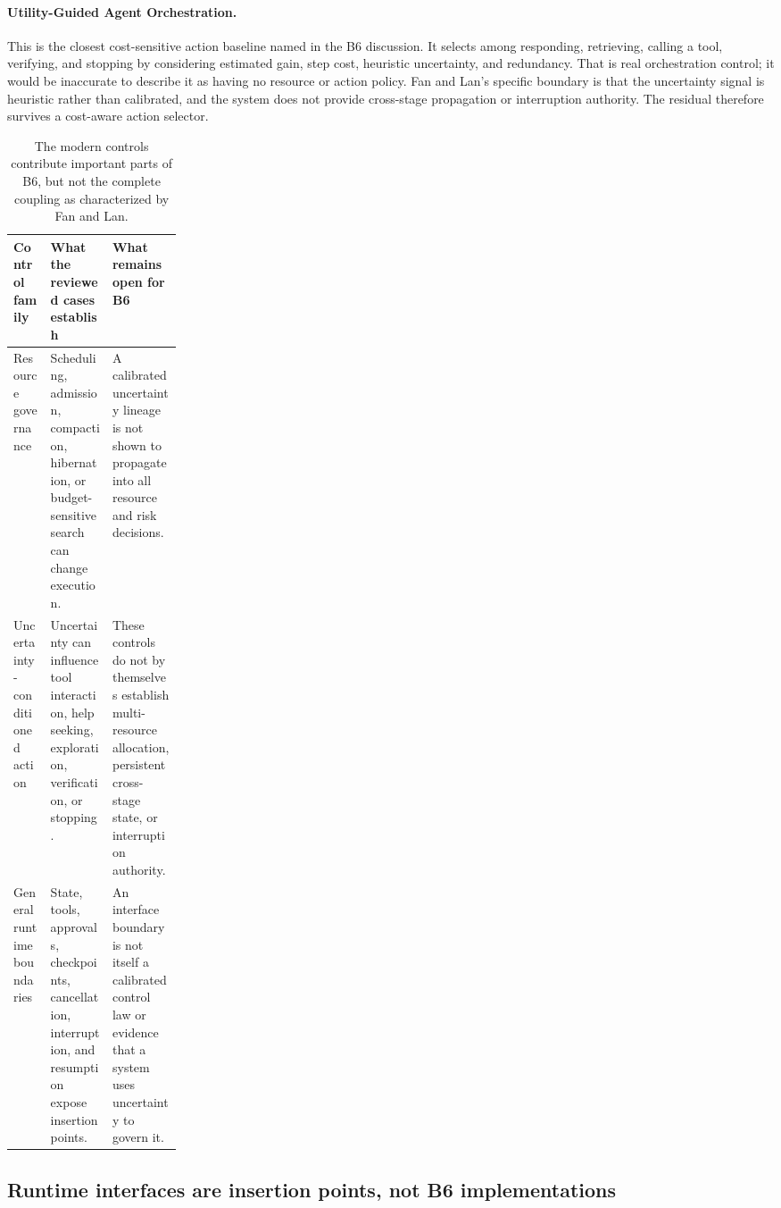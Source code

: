 \paragraph{Utility-Guided Agent Orchestration.} This is the closest cost-sensitive action baseline named in the B6 discussion. It selects among responding, retrieving, calling a tool, verifying, and stopping by considering estimated gain, step cost, heuristic uncertainty, and redundancy. That is real orchestration control; it would be inaccurate to describe it as having no resource or action policy. Fan and Lan's specific boundary is that the uncertainty signal is heuristic rather than calibrated, and the system does not provide cross-stage propagation or interruption authority. The residual therefore survives a cost-aware action selector.\autocite{liu2026utilityorchestration}

\begin{table}[tbp]
\centering
\small
\caption{The modern controls contribute important parts of B6, but not the complete coupling as characterized by Fan and Lan.}
\label{tab:ch16-modern-baselines}
\begin{tabularx}{\linewidth}{P{0.22\linewidth}XX}
\toprule
\textbf{Control family} & \textbf{What the reviewed cases establish} & \textbf{What remains open for B6} \\
\midrule
Resource governance & Scheduling, admission, compaction, hibernation, or budget-sensitive search can change execution. & A calibrated uncertainty lineage is not shown to propagate into all resource and risk decisions. \\
Uncertainty-conditioned action & Uncertainty can influence tool interaction, help seeking, exploration, verification, or stopping. & These controls do not by themselves establish multi-resource allocation, persistent cross-stage state, or interruption authority. \\
General runtime boundaries & State, tools, approvals, checkpoints, cancellation, interruption, and resumption expose insertion points. & An interface boundary is not itself a calibrated control law or evidence that a system uses uncertainty to govern it. \\
\bottomrule
\end{tabularx}
\end{table}

\subsection{Runtime interfaces are insertion points, not B6 implementations}
\label{sec:ch16-runtime-insertion-points}

